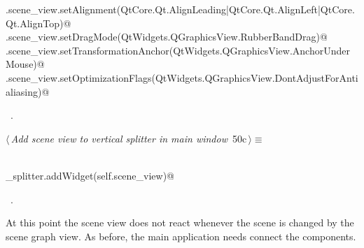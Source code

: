 \documentclass[
    a4paper,      %
    10pt,         %
    openright,    %
    notitlepage,  %
    parskip=half, %
]{scrreprt}       %
\theoremstyle{definition}                    %
\begin{document}
\begin{flushleft}
\begin{minipage}{\linewidth}
\begin{list}{}{}
\mbox{}\lstinline@self.scene_view.setAlignment(QtCore.Qt.AlignLeading|QtCore.Qt.AlignLeft|QtCore.Qt.AlignTop)@\\
\mbox{}\lstinline@self.scene_view.setDragMode(QtWidgets.QGraphicsView.RubberBandDrag)@\\
\mbox{}\lstinline@self.scene_view.setTransformationAnchor(QtWidgets.QGraphicsView.AnchorUnderMouse)@\\
\mbox{}\lstinline@self.scene_view.setOptimizationFlags(QtWidgets.QGraphicsView.DontAdjustForAntialiasing)@\\
\mbox{}\lstinline@@{\NWsep}
\end{list}
\vspace{-1.5ex}
\footnotesize
\begin{list}{}{\setlength{\itemsep}{-\parsep}\setlength{\itemindent}{-\leftmargin}}
\item \NWtxtMacroRefIn\ .

\item{}
\end{list}
\end{minipage}\vspace{4ex}
\end{flushleft}
\begin{flushleft} \small
\begin{minipage}{\linewidth}\label{scrap75}\raggedright\small
{} $\langle\,${\itshape Add scene view to vertical splitter in main window}\nobreak\ {\footnotesize {50c}}$\,\rangle\equiv$
\vspace{-1exm}
\begin{list}{}{} \item
\mbox{}\lstinline@@\\
\mbox{}\lstinline@vertical_splitter.addWidget(self.scene_view)@\\
\mbox{}\lstinline@@{\NWsep}
\end{list}
\vspace{-1.5ex}
\footnotesize
\begin{list}{}{\setlength{\itemsep}{-\parsep}\setlength{\itemindent}{-\leftmargin}}
\item \NWtxtMacroRefIn\ .

\item{}
\end{list}
\end{minipage}\vspace{4ex}
\end{flushleft}
At this point the scene view does not react whenever the scene is changed by the
scene graph view. As before, the main application needs connect the components.
\end{document}
